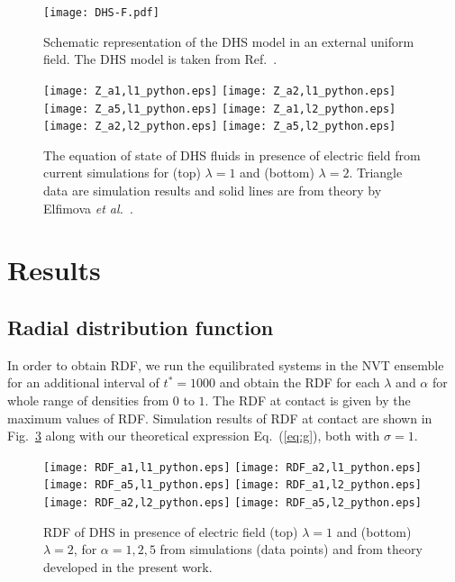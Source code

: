 \documentclass[preprint,pre,aps,superscriptaddress,a4paper]{revtex4}
\begin{document}
\begin{figure}
\texttt{[image: DHS-F.pdf]}
\caption{Schematic representation of the DHS model in an external uniform field. The DHS model is taken from Ref.~\cite{faezeh:19:00}.}
\label{DHS-F}\vspace{0.1cm}
\end{figure}

\begin{figure}[th]
\texttt{[image: Z\_a1,l1\_python.eps]}
\texttt{[image: Z\_a2,l1\_python.eps]}
\texttt{[image: Z\_a5,l1\_python.eps]}
\texttt{[image: Z\_a1,l2\_python.eps]}
\texttt{[image: Z\_a2,l2\_python.eps]}
\texttt{[image: Z\_a5,l2\_python.eps]}
\caption{The equation of state of DHS fluids in presence of electric field from current simulations for (top) $\lambda=1$ and (bottom)  $\lambda=2$. Triangle data are simulation results  and solid lines are from theory by Elfimova {\it {et al.}}~\cite{Elfimova:16:00}. }
\label{com}
\end{figure}

\section{Results }
\subsection{Radial distribution function}
In order to obtain RDF, we run  the equilibrated systems in the NVT ensemble for an additional interval of $t^*=1000$
and obtain the  RDF for each  $\lambda$ and $\alpha$ for whole range of densities from $0$ to $1$.
The RDF at contact is given by the maximum values of RDF.
Simulation results of RDF at contact are shown in Fig.~\ref{RDF_plots}  along with our theoretical expression Eq.~(\ref{eq:g}), both with  $\sigma=1$.
\begin{figure}[]
\texttt{[image: RDF\_a1,l1\_python.eps]}
\texttt{[image: RDF\_a2,l1\_python.eps]}
\texttt{[image: RDF\_a5,l1\_python.eps]}
\texttt{[image: RDF\_a1,l2\_python.eps]}
\texttt{[image: RDF\_a2,l2\_python.eps]}
\texttt{[image: RDF\_a5,l2\_python.eps]}
\caption{RDF of DHS in presence of electric field (top) $\lambda=1$ and (bottom)  $\lambda=2$, for $\alpha=1,2,5$ from simulations (data points) and from theory developed in the present work. }
\label{RDF_plots}
\end{figure}
\end{document}
